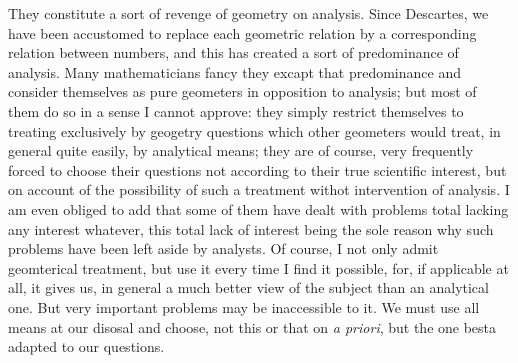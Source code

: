 \documentclass[12pt,oneside]{book}
\begin{document}
They constitute a sort of revenge of geometry on analysis. Since Descartes, we have been accustomed to replace each geometric relation by a corresponding relation between numbers, and this has created a sort of predominance of analysis. Many mathematicians fancy they excapt that predominance and consider themselves as pure geometers in opposition to analysis; but most of them do so in a sense I cannot approve: they simply restrict themselves to treating exclusively by geogetry questions which other geometers would treat, in general quite easily, by analytical means; they are of course, very frequently forced to choose their questions not according to their true scientific interest, but on account of the possibility of such a treatment withot intervention of analysis. I am even obliged to add that some of them have dealt with problems total lacking any interest whatever, this total lack of interest being the sole reason why such problems have been left aside by analysts. Of course, I not only admit geomterical treatment, but use it every time I find it possible, for, if applicable at all, it gives us, in general a much better view of the subject than an analytical one. But very important problems may be inaccessible to it. We must use all means at our disosal and choose, not this or that on \textit{a priori}, but the one besta adapted to our questions. \par 
\end{document}
